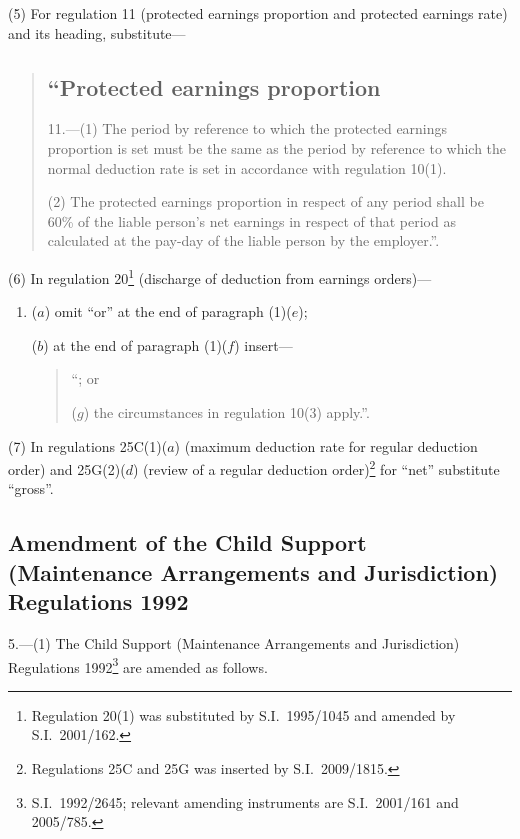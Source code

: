 \documentclass[12pt,a4paper]{article}
\begin{document}
(5) For regulation 11 (protected earnings proportion and protected earnings rate) and its heading, substitute—
\begin{quotation}
\subsection*{“Protected earnings proportion}

11.---(1)  The period by reference to which the protected earnings proportion is set must be the same as the period by reference to which the normal deduction rate is set in accordance with regulation 10(1).

(2) The protected earnings proportion in respect of any period shall be 60\% of the liable person’s net earnings in respect of that period as calculated at the pay-day of the liable person by the employer.”.
\end{quotation}

(6) In regulation 20\footnote{Regulation 20(1) was substituted by S.I.~1995/1045 and amended by S.I.~2001/162.} (discharge of deduction from earnings orders)—
\begin{enumerate}\item[]
($a$) omit “or” at the end of paragraph (1)($e$);

($b$) at the end of paragraph (1)($f$)  insert—
\begin{quotation}
“; or

($g$) the circumstances in regulation 10(3) apply.”.
\end{quotation}
\end{enumerate}

(7) In regulations 25C(1)($a$)  (maximum deduction rate for regular deduction order) and 25G(2)($d$)  (review of a regular deduction order)\footnote{Regulations 25C and 25G was inserted by S.I.~2009/1815.} for “net” substitute “gross”.

\subsection[5. Amendment of the Child Support (Maintenance Arrangements and Jurisdiction) Regulations 1992]{\sloppy Amendment of the Child Support (Maintenance Arrangements and Jurisdiction) Regulations 1992}

5.---(1)  The Child Support (Maintenance Arrangements and Jurisdiction) Regulations 1992\footnote{S.I.~1992/2645; relevant amending instruments are S.I.~2001/161 and 2005/785.} are amended as follows.
\end{document}
